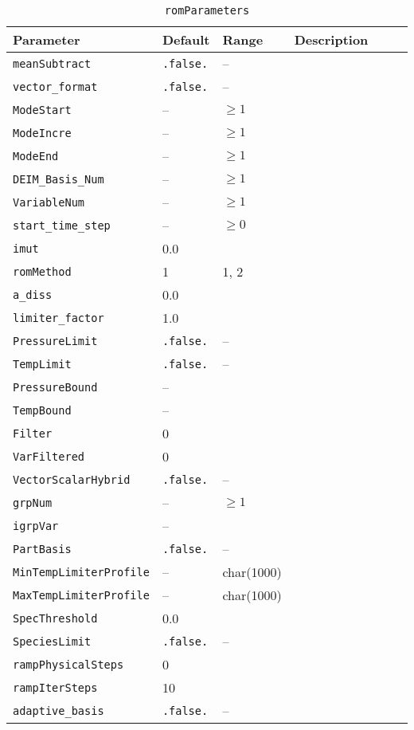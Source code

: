 \begin{table}[H]
    \centering
    \begin{tabular}{p{0.2\linewidth} p{0.1\linewidth} p{0.1\linewidth} p{0.6\linewidth}}
        \toprule
        Parameter & Default & Range & Description \\
        \midrule
        \verb|meanSubtract| & \verb|.false.| & -- &  \\
        \verb|vector_format| & \verb|.false.| & -- &  \\
        \verb|ModeStart| & -- & $\ge 1$ &  \\
        \verb|ModeIncre| & -- & $\ge 1$ &  \\
        \verb|ModeEnd| & -- & $\ge 1$ &  \\
        \verb|DEIM_Basis_Num| & -- & $\ge 1$ &  \\
        \verb|VariableNum| & -- & $\ge 1$ &  \\
        \verb|start_time_step| & -- & $\ge 0$ &  \\
        \verb|imut| & 0.0 &  &  \\
        \verb|romMethod| & 1 & 1, 2 &  \\
        \verb|a_diss| & 0.0 &  &  \\
        \verb|limiter_factor| & 1.0 &  &  \\
        \verb|PressureLimit| & \verb|.false.| & -- &  \\
        \verb|TempLimit| & \verb|.false.| & -- &  \\
        \verb|PressureBound| & -- &  &  \\
        \verb|TempBound| & -- &  &  \\
        \verb|Filter| & 0 &  &  \\
        \verb|VarFiltered| & 0 &  &  \\
        \verb|VectorScalarHybrid| & \verb|.false.| & -- &  \\
        \verb|grpNum| & -- & $\ge 1$ &  \\
        \verb|igrpVar| & -- &  &  \\
        \verb|PartBasis| & \verb|.false.| & -- &  \\
        \verb|MinTempLimiterProfile| & -- & char(1000) &  \\
        \verb|MaxTempLimiterProfile| & -- & char(1000) &  \\
        \verb|SpecThreshold| & 0.0 &  &  \\
        \verb|SpeciesLimit| & \verb|.false.| & -- &  \\
        \verb|rampPhysicalSteps| & 0 &  &  \\
        \verb|rampIterSteps| & 10 &  &  \\
        \verb|adaptive_basis| & \verb|.false.| & -- &  \\
        \bottomrule 
    \end{tabular}
    \caption{\texttt{romParameters}}
\end{table}

